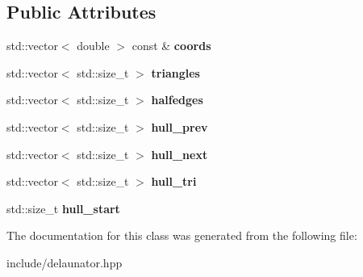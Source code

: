 \subsection*{Public Attributes}
\begin{DoxyCompactItemize}
\item 
\mbox{\label{classdelaunator_1_1Delaunator_ac48ad29af151d66885120872bf46f750}} 
std\+::vector$<$ double $>$ const  \& {\bfseries coords}
\item 
\mbox{\label{classdelaunator_1_1Delaunator_a6b613da33302f09aaea8fd74663d61cb}} 
std\+::vector$<$ std\+::size\+\_\+t $>$ {\bfseries triangles}
\item 
\mbox{\label{classdelaunator_1_1Delaunator_aff04629e1166358e4f2d43ed1e6524ef}} 
std\+::vector$<$ std\+::size\+\_\+t $>$ {\bfseries halfedges}
\item 
\mbox{\label{classdelaunator_1_1Delaunator_a9d0f92cb1eee39f5ac80f65495d543c3}} 
std\+::vector$<$ std\+::size\+\_\+t $>$ {\bfseries hull\+\_\+prev}
\item 
\mbox{\label{classdelaunator_1_1Delaunator_a8e6c50f7a0ff8c8b1f6e62c92004f57c}} 
std\+::vector$<$ std\+::size\+\_\+t $>$ {\bfseries hull\+\_\+next}
\item 
\mbox{\label{classdelaunator_1_1Delaunator_af9da27b2b5f8dc5b916b474078dd093a}} 
std\+::vector$<$ std\+::size\+\_\+t $>$ {\bfseries hull\+\_\+tri}
\item 
\mbox{\label{classdelaunator_1_1Delaunator_a28717862d3ea8ae531ee2dc7fb57b639}} 
std\+::size\+\_\+t {\bfseries hull\+\_\+start}
\end{DoxyCompactItemize}


The documentation for this class was generated from the following file\+:\begin{DoxyCompactItemize}
\item 
include/delaunator.\+hpp\end{DoxyCompactItemize}
